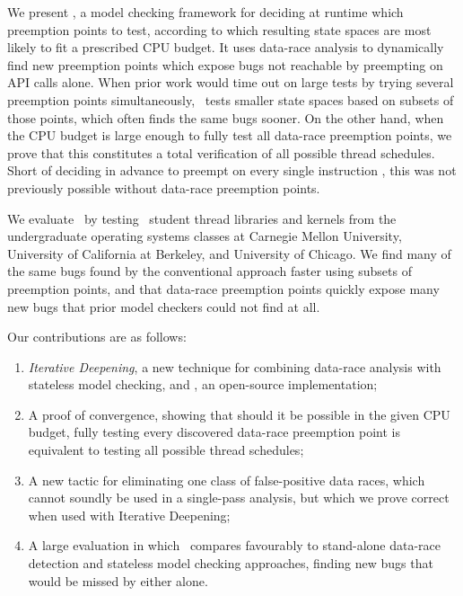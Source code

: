 We present \quicksand,
a model checking framework for deciding at runtime which preemption points to test,
according to which resulting state spaces are most likely to fit a prescribed CPU budget.
It uses data-race analysis \cite{eraser} to dynamically find new preemption points which expose bugs not reachable by preempting on API calls alone.
When prior work would time out on large tests by trying several preemption points simultaneously,
\quicksand~tests smaller state spaces based on subsets of those points, which often finds the same bugs sooner.
On the other hand, when the CPU budget is large enough to fully test all data-race preemption points,
we prove that this constitutes a total verification of all possible thread schedules.
Short of deciding in advance to preempt on every single instruction \cite{spin}, this was not previously possible without data-race preemption points.

We evaluate \quicksand~by testing \numstudence~student thread libraries and kernels from the undergraduate operating systems classes at Carnegie Mellon University, University of California at Berkeley, and University of Chicago.
We find many of the same bugs found by the conventional approach faster using subsets of preemption points,
and that data-race preemption points quickly expose many new bugs that prior model checkers could not find at all.

Our contributions are as follows:
\begin{enumerate}
	\item {\em Iterative Deepening}, a new technique for combining data-race analysis with stateless model checking, and \quicksand, an open-source implementation;
	\item A proof of convergence, showing that should it be possible in the given CPU budget,
		fully testing every discovered data-race preemption point is equivalent to testing all possible thread schedules;
	\item A new tactic for eliminating one class of false-positive data races,
		which cannot soundly be used in a single-pass analysis,
		but which we prove correct when used with Iterative Deepening;
	\item A large evaluation in which \quicksand~compares favourably to stand-alone data-race detection and stateless model checking approaches, finding new bugs that would be missed by either alone.
\end{enumerate}

